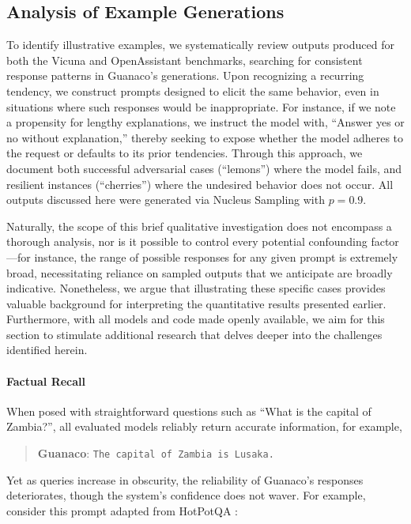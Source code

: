 \subsection{Analysis of Example Generations}
\label{ssec:examples}

To identify illustrative examples, we systematically review outputs produced for both the Vicuna and OpenAssistant benchmarks, searching for consistent response patterns in {Guanaco}'s generations. Upon recognizing a recurring tendency, we construct prompts designed to elicit the same behavior, even in situations where such responses would be inappropriate. For instance, if we note a propensity for lengthy explanations, we instruct the model with, ``Answer yes or no without explanation,'' thereby seeking to expose whether the model adheres to the request or defaults to its prior tendencies. Through this approach, we document both successful adversarial cases (``lemons'') where the model fails, and resilient instances (``cherries'') where the undesired behavior does not occur. All outputs discussed here were generated via Nucleus Sampling \cite{holtzmancurious} with $p=0.9$.

Naturally, the scope of this brief qualitative investigation does not encompass a thorough analysis, nor is it possible to control every potential confounding factor—for instance, the range of possible responses for any given prompt is extremely broad, necessitating reliance on sampled outputs that we anticipate are broadly indicative. Nonetheless, we argue that illustrating these specific cases provides valuable background for interpreting the quantitative results presented earlier. Furthermore, with all models and code made openly available, we aim for this section to stimulate additional research that delves deeper into the challenges identified herein.

\paragraph{Factual Recall} When posed with straightforward questions such as ``What is the capital of Zambia?'', all evaluated models reliably return accurate information, for example,

\begin{quote} 
    \textbf{Guanaco}:
    \texttt{The capital of Zambia is Lusaka.}
\end{quote}

Yet as queries increase in obscurity, the reliability of {Guanaco}'s responses deteriorates, though the system's confidence does not waver. For example, consider this prompt adapted from HotPotQA \citep{yang2018hotpotqa}:

